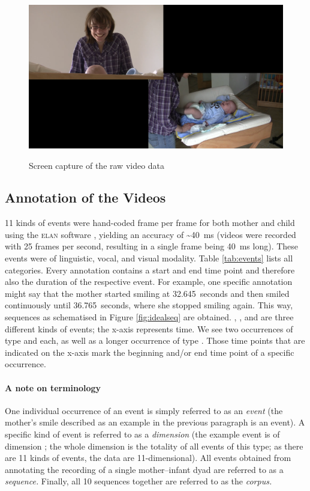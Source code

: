 \begin{figure}[h]
	\centering
	\includegraphics[width=\imgwidth]{../aux/img/video_vp_08_raw.png}
	\label{fig:rawvid}
	\caption{Screen capture of the raw video data}
\end{figure}

\subsection{Annotation of the Videos}
\label{ssec:miningmethodannotation}
11 kinds of events were hand-coded frame per frame for both mother and child using the \textsc{elan} software \citep{wittenburg06}, yielding an accuracy of \textasciitilde40~ms (videos were recorded with 25 frames per second, resulting in a single frame being 40~ms long). These events were of linguistic, vocal, and visual modality. %
Table \ref{tab:events} lists all categories. Every annotation contains a start and end time point and therefore also the duration of the respective event. For example, one specific annotation might say that the mother started smiling at 32.645~seconds and then smiled continuously until 36.765~seconds, where she stopped smiling again. This way, sequences as schematised in Figure \ref{fig:idealseq} are obtained. , , and  are three different kinds of events; the x-axis represents time. We see two occurrences of type  and  each, as well as a longer occurrence of type . Those time points that are indicated on the x-axis mark the beginning and/or end time point of a specific occurrence.

\paragraph{A note on terminology}
One individual occurrence of an event is simply referred to as an \emph{event} (the mother's smile described as an example in the previous paragraph is an event).
A specific kind of event is referred to as a \emph{dimension} (the example event is of dimension ; the whole dimension  is the totality of all events of this type; as there are 11 kinds of events, the data are 11-dimensional).
All events obtained from annotating the recording of a single mother--infant dyad are referred to as a \emph{sequence.}
Finally, all 10 sequences together are referred to as the \emph{corpus.}



